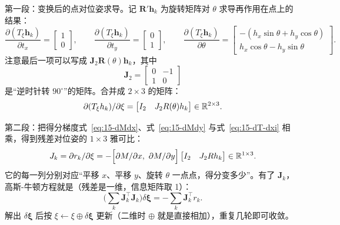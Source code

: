 第一段：变换后的点对位姿求导。记 $\bm{R}'\bm{h}_k$ 为旋转矩阵对 $\theta$ 求导再作用在点上的结果：
\begin{equation}
\frac{\partial (T_\xi\bm{h}_k)}{\partial t_x}=\begin{bmatrix}1\\0\end{bmatrix},\qquad
\frac{\partial (T_\xi\bm{h}_k)}{\partial t_y}=\begin{bmatrix}0\\1\end{bmatrix},\qquad
\frac{\partial (T_\xi\bm{h}_k)}{\partial\theta}=\begin{bmatrix}-(h_x\sin\theta+h_y\cos\theta)\\ h_x\cos\theta-h_y\sin\theta\end{bmatrix}.
\end{equation}
注意最后一项可以写成 $\bm{J}_2\bm{R}(\theta)\bm{h}_k$，其中
\begin{equation}
\bm{J}_2=\begin{bmatrix}0&-1\\1&0\end{bmatrix}
\end{equation}
是``逆时针转 $90^{\circ}$''的矩阵。合并成 $2\times3$ 的矩阵：
\begin{equation}
\partial (T_\xi h_k)/\partial\xi
=\begin{bmatrix}I_2 & J_2R(\theta)h_k\end{bmatrix}\in\mathbb{R}^{2\times3}.
\label{eq:15-dT-dxi}
\end{equation}

第二段：把得分梯度式~\eqref{eq:15-dMdx}、式~\eqref{eq:15-dMdy} 与式~\eqref{eq:15-dT-dxi} 相乘，得到残差对位姿的 $1\times3$ 雅可比：
\begin{equation}
J_k=\partial r_k/\partial\xi
=-\Big[\partial M/\partial x,\ \partial M/\partial y\Big]
\begin{bmatrix}I_2 & J_2Rh_k\end{bmatrix}\in\mathbb{R}^{1\times3}.
\label{eq:15-jac}
\end{equation}
它的每一列分别对应``平移 $x$、平移 $y$、旋转 $\theta$ 一点点，得分变多少''。有了 $\bm{J}_k$，高斯-牛顿方程就是（残差是一维，信息矩阵取 1）：
\begin{equation}
\Big(\sum_{k}\bm{J}_k^{\top}\bm{J}_k\Big)\delta\bm{\xi}
=-\sum_{k}\bm{J}_k^{\top}r_k .
\label{eq:15-gn}
\end{equation}
解出 $\delta\bm{\xi}$ 后按 $\xi\leftarrow\xi\oplus\delta\bm{\xi}$ 更新（二维时 $\oplus$ 就是直接相加），重复几轮即可收敛。


